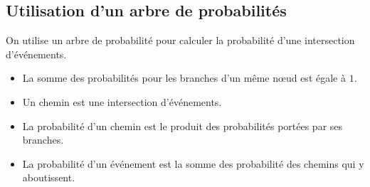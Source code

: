 \documentclass[12pt,a4paper]{article}
\begin{document}
\subsection{Utilisation d'un arbre de probabilités}	
	
\begin{mymeth}
	On utilise un arbre de probabilité pour calculer la probabilité d'une intersection d'événements.\\
	\begin{itemize}
		\item La somme des probabilités pour les branches d'un même n\oe ud est égale à $1$.
		\item Un chemin est une intersection d'événements.
		\item La probabilité d'un chemin est le produit des probabilités portées par ses branches.
		\item La probabilité d'un événement est la somme des probabilité des chemins qui y aboutissent.
	\end{itemize}

	
\end{mymeth}
	


\end{document}
